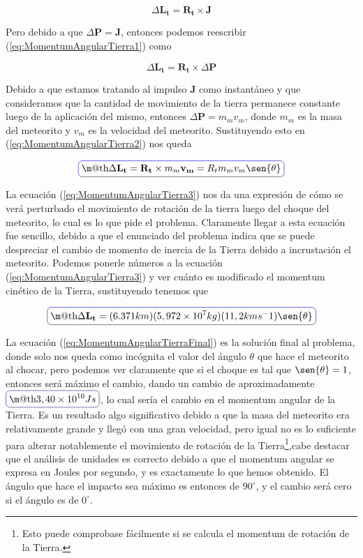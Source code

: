 \documentclass[a4paper,10pt]{article}
\makeatletter
\numberwithin{equation}{section}
\newcommand*{\boxcolor}{blue}
\renewcommand{\boxed}[1]{\textcolor{\boxcolor}{%
\tikz[baseline={([yshift=-1ex]current bounding box.center)}] \node [rectangle, minimum width=1ex,rounded corners,draw] {\normalcolor\m@th$\displaystyle#1$};}}
\makeatother
\begin{document}
\begin{equation}
 \Delta \mathbf{L_t} = \mathbf{R_t} \times \mathbf{J}
 \label{eq:MomentumAngularTierra1}
\end{equation}

Pero debido a que $\Delta \mathbf{P} = \mathbf{J}$, entonces podemos reescribir 
(\ref{eq:MomentumAngularTierra1}) como

\begin{equation}
 \Delta \mathbf{L_t} = \mathbf{R_t} \times \Delta \mathbf{P}
 \label{eq:MomentumAngularTierra2} 
\end{equation}

Debido a que estamos tratando al impulso $\mathbf{J}$ como instantáneo y que consideramos
que la cantidad de movimiento de la tierra permanece constante luego de la aplicación
del mismo, entonces $\Delta \mathbf{P} = m_m v_m$, donde $m_m$ es la masa del meteorito
y $v_m$ es la velocidad del meteorito. Sustituyendo esto en (\ref{eq:MomentumAngularTierra2})
nos queda

\begin{equation}
 \boxed{\Delta \mathbf{L_t} = \mathbf{R_t} \times m_m \mathbf{v_m} = R_t m_m v_m \sen{\theta}}
 \label{eq:MomentumAngularTierra3}
\end{equation}

La ecuación (\ref{eq:MomentumAngularTierra3}) nos da una expresión de cómo se verá
perturbado el movimiento de rotación de la tierra luego del choque del meteorito, lo cual
es lo que pide el problema. Claramente llegar a esta ecuación fue sencillo, debido a que
el enunciado del problema indica que se puede despreciar el cambio de momento de inercia
de la Tierra debido a incrustación el meteorito. Podemos ponerle números a la ecuación
(\ref{eq:MomentumAngularTierra3}) y ver cuánto es modificado el momentum cinético de la 
Tierra, sustituyendo tenemos que

\begin{equation}
 \boxed{\Delta \mathbf{L_t} = (6.371 km) (5,972 \times 10^7 kg) (11,2 km s^-1) \sen{\theta}}
 \label{eq:MomentumAngularTierraFinal}
\end{equation}

La ecuación (\ref{eq:MomentumAngularTierraFinal}) es la solución final al problema,
donde solo nos queda como incógnita el valor del ángulo $\theta$ que hace el meteorito
al chocar, pero podemos ver claramente que si el choque es tal que $\sen{\theta} = 1$, entonces
será máximo el cambio, dando un cambio de aproximadamente $\boxed{3,40 \times 10^{10} Js}$, lo cual
sería el cambio en el momentum angular de la Tierra. Es un resultado algo significativo
debido a que la masa del meteorito era relativamente grande y llegó con una gran velocidad,
pero igual no es lo suficiente para alterar notablemente el movimiento de rotación de la 
Tierra\footnote{Esto puede comprobase fácilmente si se calcula el momentum de rotación de 
la Tierra.},cabe destacar que el análisis de unidades es correcto debido a que el momentum angular
se expresa en Joules por segundo, y es exactamente lo que hemos obtenido. El ángulo
que hace el impacto sea máximo es entonces de $90^\circ$, y el cambio será cero si 
el ángulo es de $0^\circ$.
\end{document}
